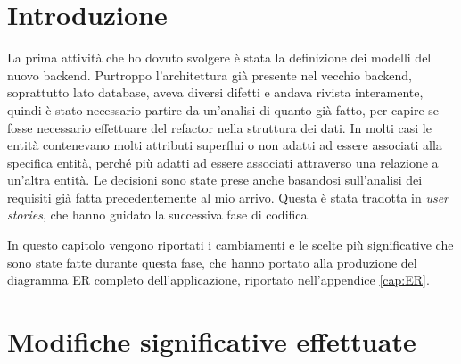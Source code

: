 \section{Introduzione}
La prima attività che ho dovuto svolgere è stata la definizione dei modelli del nuovo backend. Purtroppo l'architettura già presente nel vecchio backend, soprattutto lato database, aveva diversi difetti e andava rivista interamente, quindi è stato necessario partire da un'analisi di quanto già fatto, per capire se fosse necessario effettuare del refactor nella struttura dei dati. In molti casi le entità contenevano molti attributi superflui o non adatti ad essere associati alla specifica entità, perché più adatti ad essere associati attraverso una relazione a un'altra entità. Le decisioni sono state prese anche basandosi sull'analisi dei requisiti già fatta precedentemente al mio arrivo. Questa è stata tradotta in \emph{user stories}, che hanno guidato la successiva fase di codifica.

In questo capitolo vengono riportati i cambiamenti e le scelte più significative che sono state fatte durante questa fase, che hanno portato alla produzione del diagramma ER completo dell'applicazione, riportato nell'appendice \ref{cap:ER}.

\section{Modifiche significative effettuate}
